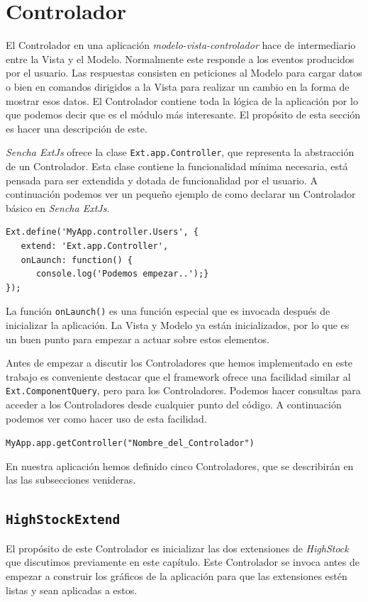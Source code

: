\section{Controlador}
	El Controlador en una aplicación \emph{modelo-vista-controlador}\cite{MVCWiki} hace de intermediario entre la Vista y el Modelo. Normalmente
	este responde a los eventos producidos por el usuario. Las respuestas consisten en peticiones al Modelo para cargar datos o bien en comandos
	dirigidos a la Vista para realizar un cambio en la forma de mostrar esos datos. El Controlador contiene toda la lógica de la aplicación por lo
	que podemos decir que es el módulo más interesante. El propósito de esta sección es hacer una descripción de este.
	\par
	\emph{Sencha ExtJs} ofrece la clase \texttt{Ext.app.Controller}, que representa la abstracción de un Controlador. Esta clase contiene la
	funcionalidad mínima necesaria, está pensada para ser extendida y dotada de funcionalidad por el usuario. A continuación podemos ver un
	pequeño ejemplo de como declarar un Controlador básico en \emph{Sencha ExtJs}.
	\begin{lstlisting}[style=myJs]
Ext.define('MyApp.controller.Users', {
   extend: 'Ext.app.Controller',
   onLaunch: function() {
      console.log('Podemos empezar..');}
});
	\end{lstlisting}
	\par
	La función \texttt{onLaunch()} es una función especial que es invocada después de inicializar la aplicación. La Vista y Modelo ya están
	inicializados, por lo que es un buen punto para empezar a actuar sobre estos elementos.
	\par
	Antes de empezar a discutir los Controladores que hemos implementado en este trabajo es conveniente destacar que el framework ofrece una
	facilidad similar al \texttt{Ext.ComponentQuery}, pero para los Controladores. Podemos hacer consultas para acceder a los Controladores desde
	cualquier punto del código. A continuación podemos ver como hacer uso de esta facilidad.
    		\begin{center} \texttt{MyApp.app.getController("Nombre\_del\_Controlador")}  \end{center}
	\par
	En nuestra aplicación hemos definido cinco Controladores, que se describirán en las las subsecciones venideras.
	\subsection{\texttt{HighStockExtend}}
		El propósito de este Controlador es inicializar las dos extensiones de \emph{HighStock} que discutimos previamente en este capítulo. Este
		Controlador se invoca antes de empezar a construir los gráficos de la aplicación para que las extensiones estén listas y sean
		aplicadas a estos.
